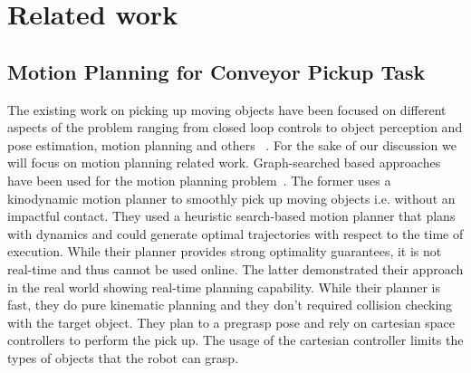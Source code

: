 \documentclass[conference]{IEEEtran}
\begin{document}
\section{Related work}
\subsection{Motion Planning for Conveyor Pickup Task}
The existing work on picking up moving objects have been focused on different aspects of the problem ranging from closed loop controls to object perception and pose estimation, motion planning and others~\cite{allen1993automated, zhang2018gilbreth, stogl2017tracking, han2019toward} . For the sake of our discussion we will focus on motion planning related work. Graph-searched based approaches have been used for the motion planning problem~\cite{menon2014motion, cowley2013perception}. The former uses a kinodynamic motion planner to smoothly pick up moving objects i.e. without an impactful contact. They used a heuristic search-based motion planner that plans with dynamics and could generate optimal trajectories with respect to the time of execution. While their planner provides strong optimality guarantees, it is not real-time and thus cannot be used online.
%
The latter demonstrated their approach in the real world showing real-time planning capability. While their planner is fast, they do pure kinematic planning and they don't required collision checking with the target object. They plan to a pregrasp pose and rely on cartesian space controllers to perform the pick up. The usage of the cartesian controller limits the types of objects that the robot can grasp.
\end{document}
